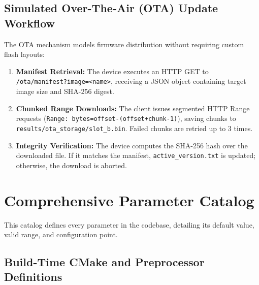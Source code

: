 \documentclass[11pt,a4paper]{article}
\newcommand{\code}[1]{\texttt{#1}}
\begin{document}
\subsection{Simulated Over-The-Air (OTA) Update Workflow}
The OTA mechanism models firmware distribution without requiring custom flash layouts:
\begin{enumerate}
  \item \textbf{Manifest Retrieval:} The device executes an HTTP GET to \code{/ota/manifest?image=<name>}, receiving a JSON object containing target image size and SHA-256 digest.
  \item \textbf{Chunked Range Downloads:} The client issues segmented HTTP Range requests (\code{Range: bytes=offset-(offset+chunk-1)}), saving chunks to \code{results/ota\_storage/slot\_b.bin}. Failed chunks are retried up to 3 times.
  \item \textbf{Integrity Verification:} The device computes the SHA-256 hash over the downloaded file. If it matches the manifest, \code{active\_version.txt} is updated; otherwise, the download is aborted.
\end{enumerate}

\section{Comprehensive Parameter Catalog}

This catalog defines every parameter in the codebase, detailing its default value, valid range, and configuration point.

\subsection{Build-Time CMake and Preprocessor Definitions}
\end{document}
